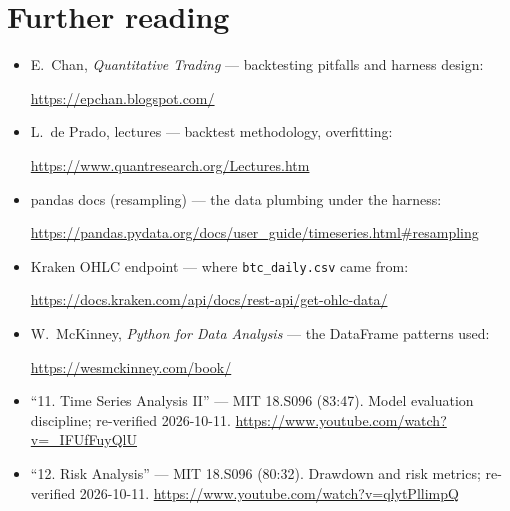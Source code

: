 \section*{Further reading}
\begin{itemize}
\item E.~Chan, \emph{Quantitative Trading} --- backtesting pitfalls and harness design:

\url{https://epchan.blogspot.com/}
\item L.~de Prado, lectures --- backtest methodology, overfitting:

\url{https://www.quantresearch.org/Lectures.htm}
\item pandas docs (resampling) --- the data plumbing under the harness:

\url{https://pandas.pydata.org/docs/user_guide/timeseries.html#resampling}
\item Kraken OHLC endpoint --- where \texttt{btc\_daily.csv} came from:

\url{https://docs.kraken.com/api/docs/rest-api/get-ohlc-data/}
\item W.~McKinney, \emph{Python for Data Analysis} --- the DataFrame patterns used:

\url{https://wesmckinney.com/book/}
\end{itemize}

\begin{rulebox}
\begin{itemize}
\item ``11. Time Series Analysis II'' --- MIT 18.S096 (83:47). Model evaluation discipline;
re-verified 2026-10-11.
\url{https://www.youtube.com/watch?v=_IFUfFuyQlU}
\item ``12. Risk Analysis'' --- MIT 18.S096 (80:32). Drawdown and risk metrics; re-verified
2026-10-11.
\url{https://www.youtube.com/watch?v=qlytPllimpQ}
\end{itemize}
\end{rulebox}
